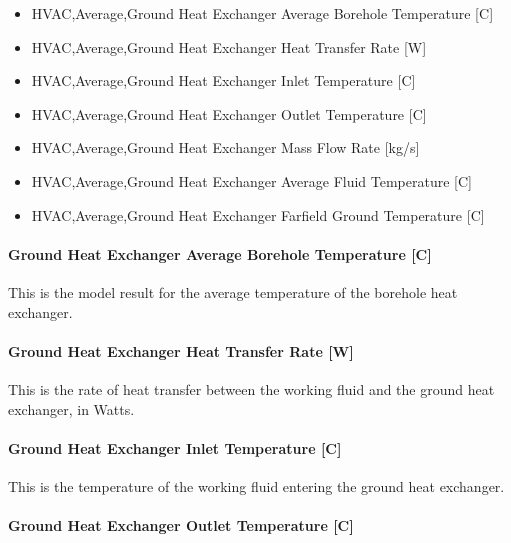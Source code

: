 \begin{itemize}
\item
  HVAC,Average,Ground Heat Exchanger Average Borehole Temperature {[}C{]}
\item
  HVAC,Average,Ground Heat Exchanger Heat Transfer Rate {[}W{]}
\item
  HVAC,Average,Ground Heat Exchanger Inlet Temperature {[}C{]}
\item
  HVAC,Average,Ground Heat Exchanger Outlet Temperature {[}C{]}
\item
  HVAC,Average,Ground Heat Exchanger Mass Flow Rate {[}kg/s{]}
\item
  HVAC,Average,Ground Heat Exchanger Average Fluid Temperature {[}C{]}
\item
  HVAC,Average,Ground Heat Exchanger Farfield Ground Temperature {[}C{]}
\end{itemize}

\paragraph{Ground Heat Exchanger Average Borehole Temperature {[}C{]}}\label{ground-heat-exchanger-average-borehole-temperature-c}

This is the model result for the average temperature of the borehole heat exchanger.

\paragraph{Ground Heat Exchanger Heat Transfer Rate {[}W{]}}\label{ground-heat-exchanger-heat-transfer-rate-w}

This is the rate of heat transfer between the working fluid and the ground heat exchanger, in Watts.

\paragraph{Ground Heat Exchanger Inlet Temperature {[}C{]}}\label{ground-heat-exchanger-inlet-temperature-c}

This is the temperature of the working fluid entering the ground heat exchanger.

\paragraph{Ground Heat Exchanger Outlet Temperature {[}C{]}}\label{ground-heat-exchanger-outlet-temperature-c}

